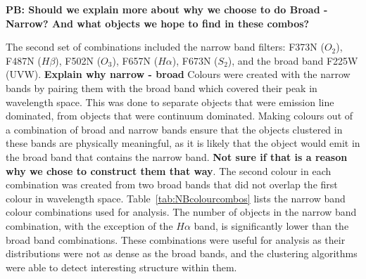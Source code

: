\textbf{PB: Should we explain more about why we choose to do Broad - Narrow? And what objects we hope to find in these combos?}

The second set of combinations included the narrow band filters: F373N ($O_{2}$), F487N ($H\beta$), F502N ($O_{3}$), F657N ($H\alpha$), F673N ($S_{2}$), and the broad band F225W (UVW).
\textbf{Explain why narrow - broad}
Colours were created with the narrow bands by pairing them with the broad band which covered their peak in wavelength space.
This was done to separate objects that were emission line dominated, from objects that were continuum dominated.
Making colours out of a combination of broad and narrow bands ensure that the objects clustered in these bands are physically meaningful, as it is likely that the object would emit in the broad band that contains the narrow band. \textbf{Not sure if that is a reason why we chose to construct them that way}.
The second colour in each combination was created from two broad bands that did not overlap the first colour in wavelength space.
Table~\ref{tab:NBcolourcombos} lists the narrow band colour combinations used for analysis.
The number of objects in the narrow band combination, with the exception of the $H\alpha$ band, is significantly lower than the broad band combinations.
These combinations were useful for analysis as their distributions were not as dense as the broad bands, and the clustering algorithms were able to detect interesting structure within them.

